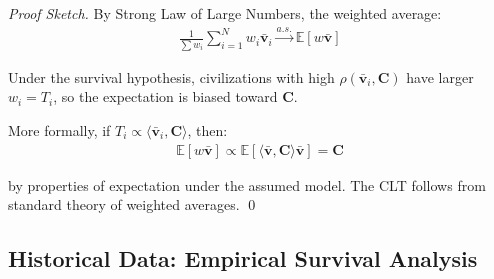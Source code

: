 \documentclass[11pt,a4paper]{article}
\theoremstyle{definition}
\theoremstyle{remark}
\begin{document}
\begin{proof}[Proof Sketch]
By Strong Law of Large Numbers, the weighted average:
\begin{align}
\frac{1}{\sum w_i}\sum_{i=1}^N w_i \bar{\mathbf{v}}_i \xrightarrow{a.s.} \mathbb{E}[w \bar{\mathbf{v}}]
\end{align}

Under the survival hypothesis, civilizations with high \(\rho(\bar{\mathbf{v}}_i, \mathbf{C})\) have larger \(w_i = T_i\), so the expectation is biased toward \(\mathbf{C}\).

More formally, if \(T_i \propto \langle \bar{\mathbf{v}}_i, \mathbf{C} \rangle\), then:
\begin{align}
\mathbb{E}[w \bar{\mathbf{v}}] \propto \mathbb{E}[\langle \bar{\mathbf{v}}, \mathbf{C} \rangle \bar{\mathbf{v}}] = \mathbf{C}
\end{align}

by properties of expectation under the assumed model. The CLT follows from standard theory of weighted averages. \qed
\end{proof}

\subsection{Historical Data: Empirical Survival Analysis}
\end{document}
